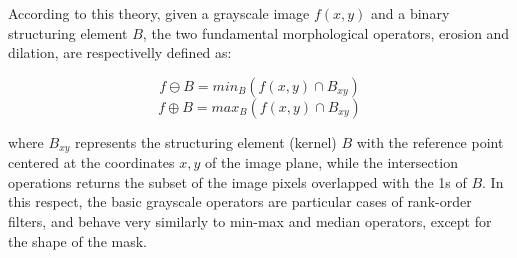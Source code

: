 \documentclass{ieeeaccess}
\begin{document}
According to this theory, given a grayscale image $f(x,y)$ and a binary structuring element $B$, the two fundamental morphological operators, erosion and dilation, are respectivelly defined as:

\begin{equation} \label{eq:erode}
f \ominus B = min_B(f(x,y) \cap B_{xy})
\end{equation}
\begin{equation} \label{eq:dilate}
f \oplus B = max_B(f(x,y) \cap B_{xy})
\end{equation}

where $B_{xy}$ represents the structuring element (kernel) $B$ with the reference point centered at the coordinates $x,y$ of the image plane, while the intersection operations returns the subset of the image pixels overlapped with the 1s of $B$. In this respect, the basic grayscale operators are particular cases of rank-order filters, and behave very similarly to min-max and median operators, except for the shape of the mask.
\end{document}
